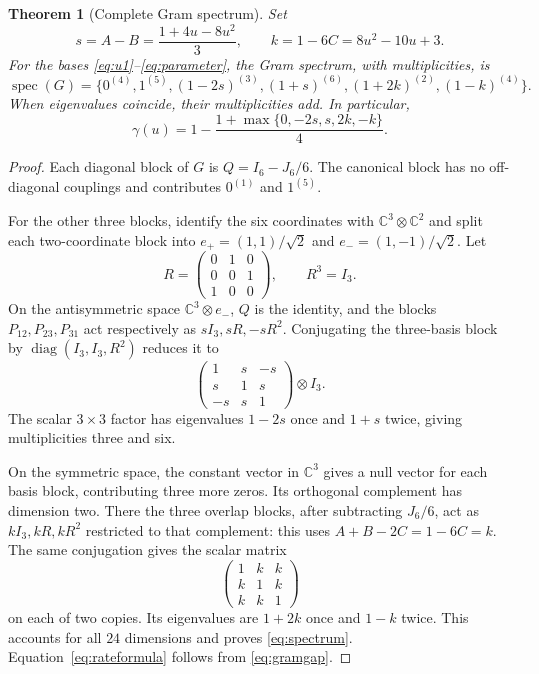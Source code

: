 \documentclass[11pt,a4paper]{article}
\newtheorem{theorem}{Theorem}[section]
\theoremstyle{remark}
\DeclareMathOperator{\spec}{spec}
\DeclareMathOperator{\diag}{diag}
\newcommand{\C}{\mathbb C}
\begin{document}
\begin{theorem}[Complete Gram spectrum]\label{thm:spectrum}
Set
\begin{equation}\label{eq:sk}
 s=A-B=\frac{1+4u-8u^2}{3},\qquad
 k=1-6C=8u^2-10u+3.
\end{equation}
For the bases \eqref{eq:u1}--\eqref{eq:parameter}, the Gram spectrum, with multiplicities, is
\begin{equation}\label{eq:spectrum}
 \spec(G)=\{0^{(4)},1^{(5)},(1-2s)^{(3)},(1+s)^{(6)},
                       (1+2k)^{(2)},(1-k)^{(4)}\}.
\end{equation}
When eigenvalues coincide, their multiplicities add. In particular,
\begin{equation}\label{eq:rateformula}
 \gamma(u)=1-\frac{1+\max\{0,-2s,s,2k,-k\}}4.
\end{equation}
\end{theorem}
\begin{proof}
Each diagonal block of $G$ is $Q=I_6-J_6/6$. The canonical block has no off-diagonal couplings and contributes $0^{(1)}$ and $1^{(5)}$.

For the other three blocks, identify the six coordinates with $\C^3\otimes\C^2$ and split each two-coordinate block into $e_+=(1,1)/\sqrt2$ and $e_-=(1,-1)/\sqrt2$. Let
\[
 R=\begin{pmatrix}0&1&0\\0&0&1\\1&0&0\end{pmatrix},\qquad R^3=I_3.
\]
On the antisymmetric space $\C^3\otimes e_-$, $Q$ is the identity, and the blocks $P_{12},P_{23},P_{31}$ act respectively as $sI_3,sR,-sR^2$. Conjugating the three-basis block by $\diag(I_3,I_3,R^2)$ reduces it to
\[
 \begin{pmatrix}1&s&-s\\s&1&s\\-s&s&1\end{pmatrix}\otimes I_3.
\]
The scalar $3\times3$ factor has eigenvalues $1-2s$ once and $1+s$ twice, giving multiplicities three and six.

On the symmetric space, the constant vector in $\C^3$ gives a null vector for each basis block, contributing three more zeros. Its orthogonal complement has dimension two. There the three overlap blocks, after subtracting $J_6/6$, act as $kI_3,kR,kR^2$ restricted to that complement: this uses $A+B-2C=1-6C=k$. The same conjugation gives the scalar matrix
\[
 \begin{pmatrix}1&k&k\\k&1&k\\k&k&1\end{pmatrix}
\]
on each of two copies. Its eigenvalues are $1+2k$ once and $1-k$ twice. This accounts for all $24$ dimensions and proves \eqref{eq:spectrum}. Equation~\eqref{eq:rateformula} follows from \eqref{eq:gramgap}.
\end{proof}
\end{document}
